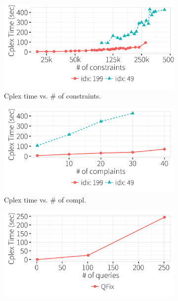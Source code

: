   
  \begin{figure}[t]
  \centering
      \begin{subfigure} [t]{.3\textwidth}
    \includegraphics[width = .99\columnwidth]{figures/num_cons_time}
    \vspace*{-.25in}
    \caption{Cplex time vs. \# of constraints. }
    \vspace*{-.1in}
    \label{f:heuristic_time} 
    \end{subfigure}
    \begin{subfigure} [t]{.3\textwidth}
    \includegraphics[width = .99\columnwidth]{figures/num_compl_time}
    \vspace*{-.25in}
    \caption{Cplex time vs. \# of compl. }
    \vspace*{-.1in}
    \label{f:heuristic_acc} 
    \end{subfigure}
    \begin{subfigure} [t]{.3\textwidth}
    \includegraphics[width = .99\columnwidth]{figures/num_queries_time}

\end{subfigure}
\end{figure}
